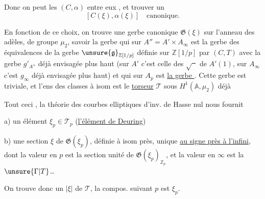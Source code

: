 
Donc on peut   les $(C,\alpha)$  entre eux , et trouver un
\[
[C(\xi),\alpha(\xi)]\quad\text{canonique}.
\]


En fonction de ce choix, on trouve une gerbe canonique $\mathfrak G(\xi)$ sur l'anneau des adèles, de groupe $\mu_2$, savoir la gerbe qui sur $A''=A'\times A_\infty$ est la gerbe des équivalences de la gerbe $\unsure{\mathfrak g}_{\mathbb Z[1/p]}$  définie sur $\mathbb Z[1/p]$ par $(C,T)$  avec la gerbe $g'_{A''}$ déjà envisagée plus haut (sur $A'$ c'est celle des $\sqrt{\phantom{a}}$ de $A'(1)$, sur $A_\infty$ c'est $g_\infty$ déjà envisagée plus haut) et qui sur $A_p$ est \uline{la gerbe }.
Cette gerbe est triviale, et l'ens des classes  à isom  est le \uline{torseur} $\mathcal T$ sous $H^1(\mathbb A,\mu_2)$ déjà 

Tout ceci , la théorie  des courbes elliptiques d'inv. de Hasse nul nous fournit

a) un élément $\xi_p\in\mathcal T_p$ (\uline{l'élément de Deuring})

b) une section  $\xi$ de $\mathfrak G(\xi_p)$, définie à isom près, unique \uline{au signe près à l'infini}, dont la valeur en $p$  est la section unité  de $\mathfrak G(\xi_p)_{\mathbb Z_p}$, et la valeur en $\infty$ est la  $\unsure{\Gamma|T}$\ldots

On trouve donc un  $|\xi|$ de $\mathcal T$,  la compos. suivant $p$ est $\xi_p$.
